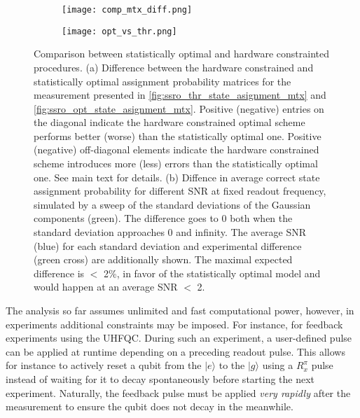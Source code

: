 \begin{figure}[H]
    \centering
    \begin{subfigure}[t]{0.40\textwidth}
     \centering 
     \texttt{[image: comp\_mtx\_diff.png]}
     \caption{ }
     \label{fig:opt_vs_thr_mtx_diff}
  \end{subfigure}
  \hspace{5pt}
  \begin{subfigure}[t]{0.48\textwidth}
     \centering 
     \texttt{[image: opt\_vs\_thr.png]}
     \caption{ }
     \label{fig:opt_vs_thr}
  \end{subfigure}
    \caption{Comparison between statistically optimal and hardware constrainted procedures. (a) Difference between the hardware constrained and statistically optimal assignment probability matrices for the measurement presented in \ref{fig:ssro_thr_state_asignment_mtx} and \ref{fig:ssro_opt_state_asignment_mtx}. Positive (negative) entries on the diagonal indicate the hardware constrained optimal scheme performs better (worse) than the statistically optimal one. Positive (negative) off-diagonal elements indicate the hardware constrained scheme introduces more (less) errors than the statistically optimal one. See main text for details. (b) Diffence in average correct state assignment probability for different SNR at fixed readout frequency, simulated by a sweep of the standard deviations of the Gaussian components (green). The difference goes to 0 both when the standard deviation approaches 0 and infinity. The average SNR (blue) for each standard deviation and experimental difference (green cross) are additionally shown.  The maximal expected difference is $<$ 2\%, in favor of the statistically optimal model and would happen at an average SNR $<$ 2.}
    \label{fig:opt_vs_thr}
\end{figure}

The analysis so far assumes unlimited and fast computational power, however, in experiments additional constraints may be imposed. For instance, for feedback experiments using the UHFQC. During such an experiment, a user-defined pulse can be applied at runtime depending on a preceding readout pulse. This allows for instance to actively reset a qubit from the $|e\rangle$ to the $|g\rangle$ using a $R^{\pi}_x$ pulse instead of waiting for it to decay spontaneously before starting the next experiment. Naturally, the feedback pulse must be applied \textit{very rapidly} after the measurement to ensure the qubit does not decay in the meanwhile.

